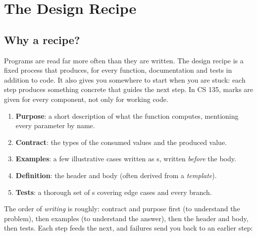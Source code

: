 \chapter{The Design Recipe}\label{ch:design-recipe}

\section{Why a recipe?}

Programs are read far more often than they are written. The design recipe is a
fixed process that produces, for every function, documentation and tests in
addition to code. It also gives you somewhere to start when you are stuck:
each step produces something concrete that guides the next step. In CS 135,
marks are given for every component, not only for working code.

\begin{important}
\begin{enumerate}
  \item \textbf{Purpose}: a short description of what the function computes, mentioning every parameter by name.
  \item \textbf{Contract}: the types of the consumed values and the produced value.
  \item \textbf{Examples}: a few illustrative cases written as s, written \emph{before} the body.
  \item \textbf{Definition}: the header and body (often derived from a \emph{template}).
  \item \textbf{Tests}: a thorough set of s covering edge cases and every branch.
\end{enumerate}
\end{important}

The order of \emph{writing} is roughly: contract and purpose first (to
understand the problem), then examples (to understand the answer), then the
header and body, then tests. Each step feeds the next, and failures send you
back to an earlier step:

\begin{center}
\end{center}

